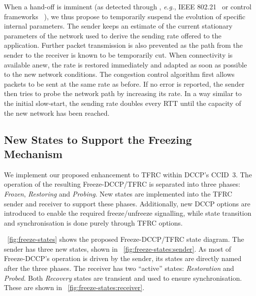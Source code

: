 \documentclass[twocolumn]{nictatechreport}
\newcommand{\latinlocution}[1]{\textit{#1}}
\newcommand{\eg}{\latinlocution{e.g.}}
\begin{document}
When a hand-off is imminent (as detected through , \eg, IEEE 802.21~\cite{2009piri_80221} or control frameworks
~\cite{2011mehani_multihomed_flow_management}), we thus propose to
temporarily suspend the evolution of specific internal parameters. The sender
keeps an estimate of the current stationary parameters of the network used to
derive the sending rate offered to the application. Further packet transmission
is also prevented as the path from the sender to the receiver is known to be
temporarily cut.  When connectivity is available anew, the rate is restored
immediately and adapted as soon as possible to the new network conditions. The
congestion control algorithm first allows packets to be sent at the same rate as
before. If no error is reported, the sender then tries to probe the network path
by increasing its rate. In a way similar to the initial slow-start, the sending
rate doubles every RTT until the capacity of the new network has been reached.

\subsection{New States to Support the Freezing Mechanism}

We implement our proposed enhancement to TFRC within DCCP's CCID~3. The
operation of the resulting Freeze-DCCP/TFRC is separated into three phases:
\emph{Frozen}, \emph{Restoring} and \emph{Probing}. New states are implemented
into the TFRC sender and receiver to support these phases. Additionally, new
DCCP options are introduced to enable the required freeze/unfreeze signalling,
while state transition and synchronisation is done purely through TFRC options.

\figurename~\ref{fig:freeze-states} shows the proposed Freeze-DCCP/TFRC state
diagram. The sender has three new states, shown in
\figurename~\ref{fig:freeze-states:sender}.  As most of Freeze-DCCP's operation
is driven by the sender, its states are directly named after the three phases.
The receiver has two ``active'' states: \emph{Restoration} and \emph{Probed}.
Both \emph{Recovery} states are transient and used to ensure synchronisation.
These are shown in \figurename~\ref{fig:freeze-states:receiver}.
\end{document}
